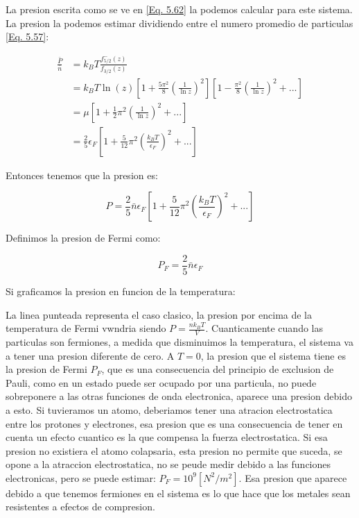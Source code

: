 \documentclass[11pt,fleqn]{book}
\begin{document}
La presion escrita como se ve en \ref{Eq. 5.62} la podemos calcular para este sistema. La presion la podemos estimar dividiendo entre el numero promedio de particulas \ref{Eq. 5.57}:

\begin{equation}
    \begin{split}
        \frac{\bar{P}}{\bar{n}}&=k_{B}T\frac{f_{5/2}^{-}(z)}{f_{3/2}(z)}\\
        &=k_{B}T\ln{(z)}\left[1+\frac{5\pi^{2}}{8}\left(\frac{1}{\ln{z}}\right)^{2}\right]\left[1-\frac{\pi^{2}}{8}\left(\frac{1}{\ln{z}}\right)^{2}+...\right]\\
        &=\mu\left[1+\frac{1}{2}\pi^{2}\left(\frac{1}{\ln{z}}\right)^{2}+...\right]\\
        &=\frac{2}{5}\epsilon_{F}\left[1+\frac{5}{12}\pi^{2}\left(\frac{k_{B}T}{\epsilon_{F}}\right)^{2}+...\right]
    \end{split}
\end{equation}

Entonces tenemos que la presion es:

\begin{equation}
    P=\frac{2}{5}\bar{n}\epsilon_{F}\left[1+\frac{5}{12}\pi^{2}\left(\frac{k_{B}T}{\epsilon_{F}}\right)^{2}+...\right]
\end{equation}

Definimos la presion de Fermi como:

\begin{equation}
    P_{F}=\frac{2}{5}\bar{n}\epsilon_{F}
\end{equation}

Si graficamos la presion en funcion de la temperatura:


La linea punteada representa el caso clasico, la presion por encima de la temperatura de Fermi vwndria siendo $P=\frac{nk_{B}T}{V}$. Cuanticamente cuando las particulas son fermiones, a medida que disminuimos la temperatura, el sistema va a tener una presion diferente de cero. A $T=0$, la presion que el sistema tiene es la presion de Fermi $P_{F}$, que es una consecuencia del principio de exclusion de Pauli, como en un estado puede ser ocupado por una particula, no puede sobreponere a las otras funciones de onda electronica, aparece una presion debido a esto. Si tuvieramos un atomo, deberiamos tener una atracion electrostatica entre los protones y electrones, esa presion que es una consecuencia de tener en cuenta un efecto cuantico es la que compensa la fuerza electrostatica. Si esa presion no existiera el atomo colapsaria, esta presion no permite que suceda, se opone a la atraccion electrostatica, no se peude medir debido a las funciones electronicas, pero se puede estimar: $P_{F}=10^{9}[N^{2}/m^{2}]$. Esa presion que aparece debido a que tenemos fermiones en el sistema es lo que hace que los metales sean resistentes a efectos de compresion. \\
\end{document}
